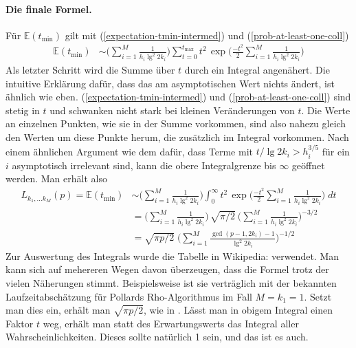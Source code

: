 \documentclass[a4paper, 10pt, ngerman]{article}
\newcommand{\E}{\mathbb{E}}
\begin{document}
    \paragraph*{Die finale Formel.} Für $\E(t_{\min})$ gilt mit (\ref{expectation-tmin-intermed}) und (\ref{prob-at-least-one-coll})
    \begin{align*}
        \E(t_{\min})
         & \sim \Bigg ( \sum_{i = 1}^M \frac 1 {h_i \lg^2 2k_i} \Bigg )
        \sum_{t = 0}^{t_{\max}} t^2 \, \exp \Bigg ( \frac {-t^2} 2
        \sum_{i = 1}^M \frac 1 {h_i \lg^2 2k_i} \Bigg )
    \end{align*}
    Als letzter Schritt wird die Summe über $t$ durch ein Integral angenähert. Die intuitive Erklärung dafür, dass das am asymptotischen Wert nichts ändert, ist ähnlich wie eben. (\ref{expectation-tmin-intermed}) und (\ref{prob-at-least-one-coll}) sind stetig in $t$ und schwanken nicht stark bei kleinen Veränderungen von $t$. Die Werte an einzelnen Punkten, wie sie in der Summe vorkommen, sind also nahezu gleich den Werten um diese Punkte herum, die zusätzlich im Integral vorkommen. Nach einem ähnlichen Argument wie dem dafür, dass Terme mit $t/\lg 2k_i > h_i^{3/5}$ für ein $i$ asymptotisch irrelevant sind, kann die obere Integralgrenze bis $\infty$ geöffnet werden. Man erhält also
    \begin{align}
        L_{k_1, \dots k_M}(p) = \E(t_{\min})
         & \sim \Bigg ( \sum_{i = 1}^M \frac 1 {h_i \lg^2 2k_i} \Bigg )
        \int_{0}^{\infty} t^2 \, \exp \Bigg ( \frac {-t^2} 2
        \sum_{i = 1}^M \frac 1 {h_i \lg^2 2k_i} \Bigg ) \; dt
        \nonumber                                                       \\
         & = \Bigg (\sum_{i = 1}^M \frac 1 {h_i \lg^2 2k_i} \Bigg ) \,
        \sqrt {\pi / 2} \
        \Bigg ( \sum_{i = 1}^M \frac 1 {h_i \lg^2 2k_i} \Bigg )^{-3/2}
        \nonumber                                                       \\
         & = \sqrt{\pi p / 2} \; \Bigg (
        \sum_{i = 1}^M \frac {\gcd(p - 1, 2k_i) - 1} {\lg^2 2k_i} \Bigg )^{-1/2}
        \label{expectation-tmin}
    \end{align}
    Zur Auswertung des Integrals wurde die Tabelle in Wikipedia: \cite{gint} verwendet. Man kann sich auf mehereren Wegen davon überzeugen, dass die Formel trotz der vielen Näherungen stimmt. Beispielsweise ist sie verträglich mit der bekannten Laufzeitabschätzung für Pollards Rho-Algorithmus im Fall $M = k_1 = 1$. Setzt man dies ein, erhält man $\sqrt{\pi p / 2}$, wie in \cite{pol75}. Lässt man in obigem Integral einen Faktor $t$ weg, erhält man statt des Erwartungswerts das Integral aller Wahrscheinlichkeiten. Dieses sollte natürlich 1 sein, und das ist es auch.
\end{document}
